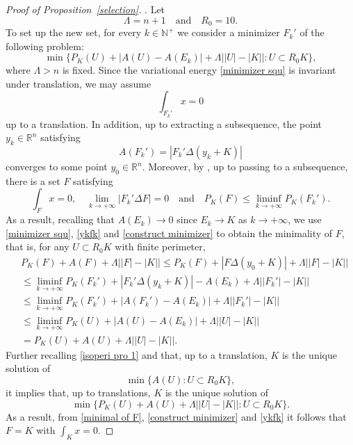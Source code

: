 \documentclass[reqno,11pt]{amsart}
\numberwithin{equation}{section}
\theoremstyle{remark}
\begin{document}
\begin{proof}[Proof of Proposition~\ref{selection}]
\medskip
    . 
    Let
    \begin{equation}\label{epsi r}
        \Lambda=n+1\quad \text{and}\quad R_0=10.
    \end{equation}
    To set up the new set, for every $k\in\mathbb N^+$ we consider a minimizer $F_k'$ of the following problem:
    \begin{equation}\label{minimizer squ}
        \min\Big\{P_K(U)+\big|A(U)-A(E_k)\big|+\Lambda\big||U|-|K|\big|:U\subset  R_0 K\Big\},
    \end{equation}
where $\Lambda>n$ is fixed. Since the variational energy \eqref{minimizer squ} is invariant under translation, we may assume 
\begin{equation}\label{bary}
    \int_{F_k'} x=0
\end{equation}
up to a translation. In addition, up to extracting a subsequence,  the point $y_k\in\mathbb R^n$ satisfying 
\begin{equation}\label{ykfk}
    A(F_k')=|F_k'\Delta (y_k+K)|
\end{equation} 
converges to some point $y_0\in \mathbb R^n$. 
Moreover,
by \cite[Theorem 12.26]{M2012}, up to passing to a subsequence, there is a set $F$ satisfying 
\begin{equation}\label{construct minimizer}
    \int_F x=0,\quad \lim_{k\to +\infty}|F_k'\Delta F|= 0\quad \text{and}\quad P_K(F)\le \liminf_{k\to +\infty}P_K(F_k').
\end{equation}
As a result, recalling that $A(E_k)\to 0$ since  $E_k\to K$ as $k\to +\infty$, we use \eqref{minimizer squ}, \eqref{ykfk} and \eqref{construct minimizer} to obtain the minimality of $F$, that is, for any $U\subset  R_0 K$ with finite perimeter,
\begin{align}\label{minimal of F}
    & P_K(F)+A(F)+\Lambda\big||F|-|K|\big|\le P_K(F)+|F\Delta (y_0+K)|+\Lambda\big||F|-|K|\big|\nonumber\\
    &\le \liminf_{k\to+\infty}P_K(F_k')+|F_k'\Delta (y_k+K)|-A(E_k)+\Lambda\big||F_k'|-|K|\big|\nonumber\\
    &\le \liminf_{k\to+\infty}P_K(F_k')+\big|A(F_k')-A(E_k)\big|+\Lambda\big||F_k'|-|K|\big|\nonumber\\
    &\le \liminf_{k\to+\infty} P_K(U)+\big|A(U)-A(E_k)\big|+\Lambda\big||U|-|K|\big|\nonumber\\
    & = P_K(U)+A(U)+\Lambda\big||U|-|K|\big|.
\end{align}
Further recalling \eqref{isoperi pro 1} and that, up to a translation, $K$ is the unique solution of 
$$\min\{A(U):U\subset  R_0 K\},$$ 
 it implies that,  up to translations, $K$ is the unique solution of 
$$\min\{ P_K(U)+A(U)+\Lambda\big||U|-|K|\big|:U\subset  R_0 K\}.$$
As a result, from \eqref{minimal of F}, \eqref{construct minimizer} and \eqref{ykfk} it follows that  $F=K$ with $\int_{K} x =0$.


\end{proof}
\end{document}
